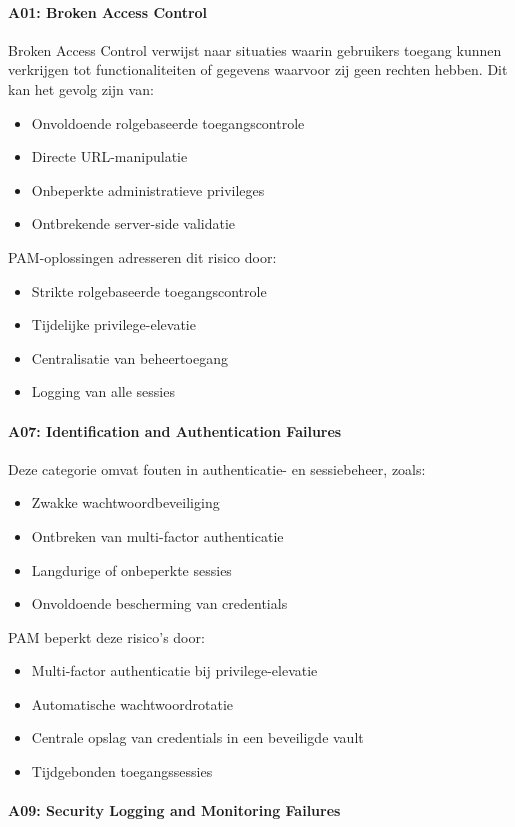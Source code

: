 \paragraph{A01: Broken Access Control}
Broken Access Control verwijst naar situaties waarin gebruikers toegang kunnen verkrijgen tot functionaliteiten of gegevens waarvoor zij geen rechten hebben. Dit kan het gevolg zijn van:

\begin{itemize}
	\item Onvoldoende rolgebaseerde toegangscontrole
	\item Directe URL-manipulatie
	\item Onbeperkte administratieve privileges
	\item Ontbrekende server-side validatie
\end{itemize}
PAM-oplossingen adresseren dit risico door:
\begin{itemize}
	\item	Strikte rolgebaseerde toegangscontrole
	\item	Tijdelijke privilege-elevatie
	\item	Centralisatie van beheertoegang
	\item	Logging van alle sessies
\end{itemize}
\paragraph{A07: Identification and Authentication Failures}
Deze categorie omvat fouten in authenticatie- en sessiebeheer, zoals:
\begin{itemize}
	\item Zwakke wachtwoordbeveiliging
	\item Ontbreken van multi-factor authenticatie
	\item Langdurige of onbeperkte sessies
	\item Onvoldoende bescherming van credentials
\end{itemize}
PAM beperkt deze risico’s door:
\begin{itemize}
	\item	Multi-factor authenticatie bij privilege-elevatie
	\item	Automatische wachtwoordrotatie
	\item	Centrale opslag van credentials in een beveiligde vault
	\item	Tijdgebonden toegangssessies
\end{itemize}
\paragraph{A09: Security Logging and Monitoring Failures}

